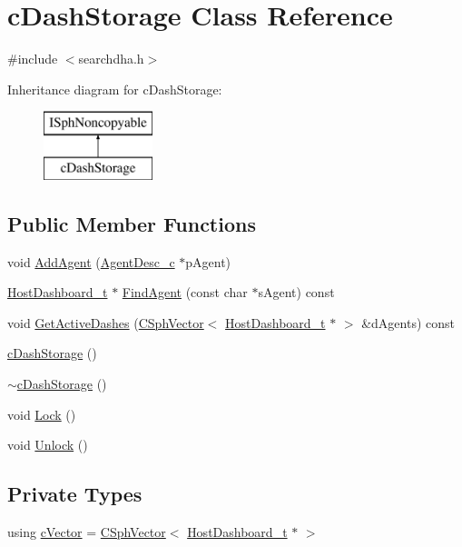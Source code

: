 \hypertarget{classcDashStorage}{\section{c\-Dash\-Storage Class Reference}
\label{classcDashStorage}
}


{\ttfamily \#include $<$searchdha.\-h$>$}

Inheritance diagram for c\-Dash\-Storage\-:\begin{figure}[H]
\begin{center}
\leavevmode
\includegraphics[height=2.000000cm]{classcDashStorage}
\end{center}
\end{figure}
\subsection*{Public Member Functions}
\begin{DoxyCompactItemize}
\item 
void \hyperlink{classcDashStorage_a9162c8077d4095520bc79effb60956d8}{Add\-Agent} (\hyperlink{classAgentDesc__c}{Agent\-Desc\-\_\-c} $\ast$p\-Agent)
\item 
\hyperlink{structHostDashboard__t}{Host\-Dashboard\-\_\-t} $\ast$ \hyperlink{classcDashStorage_a5a17b608f9b3f6b4d3edde2877a24689}{Find\-Agent} (const char $\ast$s\-Agent) const 
\item 
void \hyperlink{classcDashStorage_a60f8645081859d7e69c951cf5f7f26e0}{Get\-Active\-Dashes} (\hyperlink{classCSphVector}{C\-Sph\-Vector}$<$ \hyperlink{structHostDashboard__t}{Host\-Dashboard\-\_\-t} $\ast$ $>$ \&d\-Agents) const 
\item 
\hyperlink{classcDashStorage_a01a2432ecd7e971eb12bf0f6794c7798}{c\-Dash\-Storage} ()
\item 
\hyperlink{classcDashStorage_a25ce045d3e6debdd7362d7db7f627245}{$\sim$c\-Dash\-Storage} ()
\item 
void \hyperlink{classcDashStorage_ab7ec5b18064009a6a5e1d6490c420d74}{Lock} ()
\item 
void \hyperlink{classcDashStorage_a3d2e57c694e525b2746a09486b29c9e9}{Unlock} ()
\end{DoxyCompactItemize}
\subsection*{Private Types}
\begin{DoxyCompactItemize}
\item 
using \hyperlink{classcDashStorage_ad27c7347a9f17da9d1c9b83f854a956e}{c\-Vector} = \hyperlink{classCSphVector}{C\-Sph\-Vector}$<$ \hyperlink{structHostDashboard__t}{Host\-Dashboard\-\_\-t} $\ast$ $>$
\end{DoxyCompactItemize}
